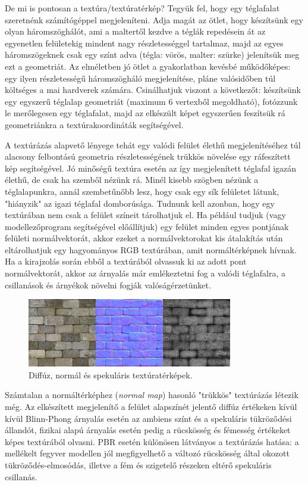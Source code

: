 De mi is pontosan a textúra/textúratérkép? Tegyük fel, hogy egy téglafalat szeretnénk számítógéppel megjeleníteni. Adja magát az ötlet, hogy készítsünk egy olyan háromszöghálót, ami a maltertől kezdve a téglák repedésein át az egyenetlen felületekig mindent nagy részletességgel tartalmaz, majd az egyes háromszögeknek csak egy színt adva (tégla: vörös, malter: szürke) jelenítsük meg ezt a geometriát. Az elméletben jó ötlet a gyakorlatban kevésbé működőképes: egy ilyen részletességű háromszögháló megjelenítése, pláne valósidőben túl költséges a mai hardverek számára. Csinálhatjuk viszont a következőt: készítsünk egy egyszerű téglalap geometriát (maximum 6 vertexből megoldható), fotózzunk le merőlegesen egy téglafalat, majd az elkészült képet egyszerűen feszítsük rá geometriánkra a textúrakoordináták segítségével.

A textúrázás alapvető lényege tehát egy valódi felület élethű megjelenítéséhez túl alacsony felbontású geometria részletességének trükkös növelése egy ráfeszített kép segítségével. Jó minőségű textúra esetén az így megjelenített téglafal igazán élethű, de csak ha szemből nézünk rá. Minél kisebb szögben nézünk a téglalapunkra, annál szembetűnőbb lesz, hogy csak egy sík felületet látunk, "hiányzik" az igazi téglafal domborúsága. Tudnunk kell azonban, hogy egy textúrában nem csak a felület színeit tárolhatjuk el. Ha például tudjuk (vagy modellezőprogram segítségével előállítjuk) egy felület minden egyes pontjának felületi normálvektorát, akkor ezeket a normálvektorokat kis átalakítás után eltárolhatjuk egy hagyományos RGB textúrában, amit normáltérképnek hívnak. Ha a kirajzolás során ebből a textúrából olvassuk ki az adott pont normálvektorát, akkor az árnyalás már emlékeztetni fog a valódi téglafalra, a csillanások és árnyékok növelni fogják valóságérzetünket.

\begin{figure}[!ht]
    \centering
    \includegraphics[width=0.8\textwidth]{images/brick_texture_maps.png}
    \caption{Diffúz, normál és spekuláris textúratérképek.}
\end{figure}

Számtalan a normáltérképhez (\textit{normal map}) hasonló "trükkös" textúrázás létezik még. Az elkészített megjelenítő a felület alapszínét jelentő diffúz értékeken kívül kívül Blinn-Phong árnyalás esetén az ambiens színt és a spekuláris tükröződési állandót, fizikai alapú árnyalás esetén pedig a rücskösség és fémesség értékeket képes textúrából olvasni. PBR esetén különösen látványos a textúrázás hatása: a mellékelt fegyver modellen jól megfigyelhető a változó rücskösség által okozott tükröződés-elmosódás, illetve a fém és szigetelő részeken eltérő spekuláris csillanás.

